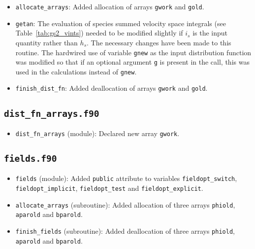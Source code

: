 \documentclass[10pt,a4paper]{article}
\begin{document}
\begin{itemize}

\item \texttt{allocate\_arrays}: Added allocation of arrays \texttt{gwork} and
  \texttt{gold}.

\item \texttt{getan}: The evaluation of species summed velocity space
  integrals (see Table~\ref{tab:gs2_vints}) needed to be modified slightly if
  $i_s$ is the input quantity rather than $h_s$. The necessary changes have
  been made to this routine. The hardwired use of variable \texttt{gnew} as
  the input distribution function was modified so that if an optional argument
  \texttt{g} is present in the call, this was used in the calculations instead
  of \texttt{gnew}.

\item \texttt{finish\_dist\_fn}: Added deallocation of arrays \texttt{gwork} and
  \texttt{gold}.

\end{itemize}

\subsection{\texttt{dist\_fn\_arrays.f90}}

\begin{itemize}

\item \texttt{dist\_fn\_arrays} (module): Declared new array \texttt{gwork}.

\end{itemize}

\subsection{\texttt{fields.f90}}

\begin{itemize}

\item \texttt{fields} (module): Added \texttt{public} attribute to variables
  \texttt{fieldopt\_switch}, \texttt{fieldopt\_implicit},
  \texttt{fieldopt\_test} and \texttt{fieldopt\_explicit}.

\item \texttt{allocate\_arrays} (subroutine): Added allocation of three arrays
  \texttt{phiold}, \texttt{aparold} and \texttt{bparold}.

\item \texttt{finish\_fields} (subroutine): Added deallocation of three arrays
  \texttt{phiold}, \texttt{aparold} and \texttt{bparold}.

\end{itemize}
\end{document}
